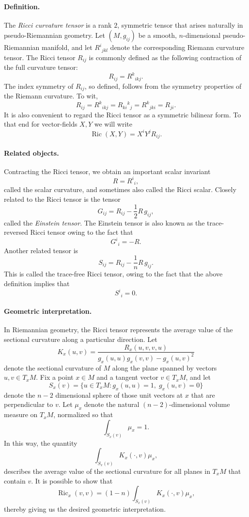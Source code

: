 \documentclass[12pt]{article}
\newcommand{\Ric}{\operatorname{Ric}}
\begin{document}
\paragraph{Definition.}
The \emph{Ricci curvature tensor} is a rank $2$, symmetric tensor that
arises naturally in pseudo-Riemannian geometry.  Let $(M,g_{ij})$ be a
smooth, $n$-dimensional pseudo-Riemannian manifold, and let
$R^i{}_{jkl}$ denote the corresponding Riemann curvature tensor.  The
Ricci tensor $R_{ij}$ is commonly defined as the following contraction
of the full curvature tensor:
\[R_{ij} = R^k{}_{ikj}.
\] 
The index symmetry of $R_{ij}$, so defined, follows from the symmetry
properties of the Riemann curvature.  To wit,
\[ R_{ij} = R^k{}_{ikj} = R_{ki}{}^k{}_j = R^k{}_{jki} = R_{ji}.\]
It is also convenient to regard the Ricci tensor as a symmetric bilinear
form.  To that end for vector-fields  $X,Y$ we will write
\[ \Ric(X,Y) = X^i Y^j R_{ij}.\]
\paragraph{Related objects.}
Contracting the Ricci tensor, we obtain an important scalar invariant
\[R=R^i{}_i,\] called the scalar curvature, and sometimes also called
the Ricci scalar.  Closely related to the Ricci tensor is the tensor
\[G_{ij} = R_{ij} - \frac{1}{2} R\, g_{ij},\] called the \emph{Einstein
tensor}.  The Einstein tensor is also known as the trace-reversed Ricci
tensor owing to the fact that
\[  G^i{}_i = - R. \]
Another related tensor is
\[S_{ij} = R_{ij} - \frac{1}{n} R\, g_{ij}.\]
This is called 
the
trace-free Ricci tensor, owing to the fact that the above definition
implies that
\[ S^i{}_i=0.\]



\paragraph{Geometric interpretation.}
In Riemannian geometry, the Ricci tensor represents the average value
of the sectional curvature along a particular direction.  
Let 
\[ K_x(u,v) = \frac{R_x(u,v,v,u)}{g_x(u,u) g_x(v,v) - g_x(u,v)^2}
\]
denote the sectional curvature of $M$ along the plane spanned by
vectors $u,v\in T_x M$. Fix a point $x\in M$ and a tangent vector
$v\in T_xM$, and let
\[
S_x(v)=\{ u\in T_xM \colon g_x(u,u) = 1,\; g_x(u,v)=0 \}
\] denote the $n-2$ dimensional
sphere of those unit vectors at $x$ that are perpendicular to $v$.
 Let $\mu_x$ denote the natural
$(n-2)$-dimensional volume measure on $T_xM$, normalized so that
\[ \int_{S_x(v)} \mu_x = 1.\]
In this way, the quantity
\[ \int_{S_x(v)}\!\! K_x(\cdot,v) \mu_x, \]
describes the average value of the sectional curvature for all planes
in $T_x M$ that contain $v$.  It is possible to show that
\[ \Ric_x(v,v)= (1-n)\int_{S_x(v)}\!\! K_x(\cdot,v) \mu_x,\]
thereby giving us the desired geometric interpretation.
\end{document}
